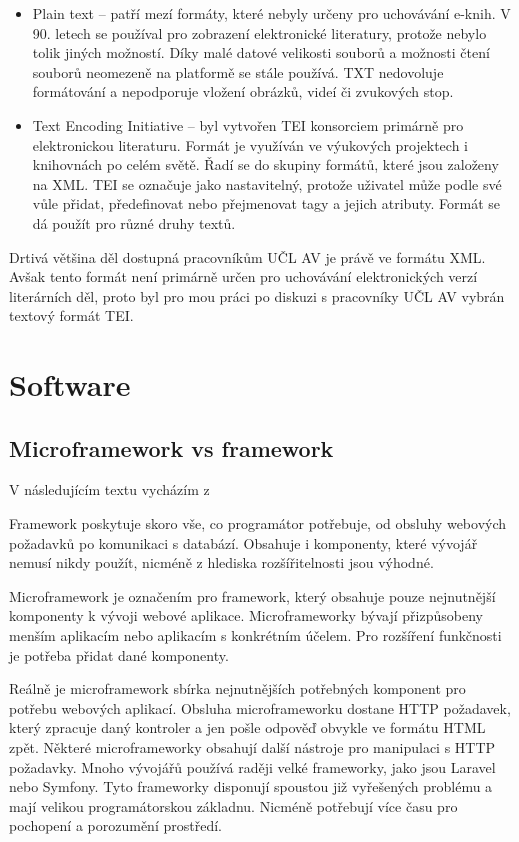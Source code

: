 \begin{itemize}
                \item Plain text – patří mezí formáty, které nebyly určeny pro uchovávání e-knih. V 90. letech se používal pro zobrazení elektronické literatury, protože nebylo tolik jiných možností. Díky malé datové velikosti souborů a možnosti čtení souborů neomezeně na platformě se stále používá. TXT nedovoluje formátování a nepodporuje vložení obrázků, videí či zvukových stop.
                
                \item Text Encoding Initiative – byl vytvořen TEI konsorciem primárně pro elektronickou literaturu. Formát je využíván ve výukových projektech i knihovnách po celém světě. Řadí se do skupiny formátů, které jsou založeny na XML. TEI se označuje jako nastavitelný, protože uživatel může podle své vůle přidat, předefinovat nebo přejmenovat tagy a jejich atributy. Formát se dá použít pro různé druhy textů.
            \end{itemize}
            
            Drtivá většina děl dostupná pracovníkům UČL AV je právě ve formátu XML. Avšak tento formát není primárně určen pro uchovávání elektronických verzí literárních děl, proto byl pro mou práci po diskuzi s pracovníky UČL AV vybrán textový formát TEI.
    \section{Software}
        \subsection{Microframework vs framework}
            V následujícím textu vycházím z \cite{microframework-vs-framework}
            
            Framework poskytuje skoro vše, co programátor potřebuje, od obsluhy webových požadavků po komunikaci s databází. Obsahuje i komponenty, které vývojář nemusí nikdy použít, nicméně z hlediska rozšířitelnosti jsou výhodné.
            
            Microframework je označením pro framework, který obsahuje pouze nejnutnější komponenty k vývoji webové aplikace. Microframeworky bývají přizpůsobeny menším aplikacím nebo aplikacím s konkrétním účelem. Pro rozšíření funkčnosti je potřeba přidat dané komponenty.
            
            Reálně je microframework sbírka nejnutnějších potřebných komponent pro potřebu webových aplikací. Obsluha microframeworku dostane HTTP požadavek, který zpracuje daný kontroler a jen pošle odpověď obvykle ve formátu HTML zpět. Některé microframeworky obsahují další nástroje pro manipulaci s HTTP požadavky. Mnoho vývojářů používá raději velké frameworky, jako jsou Laravel nebo Symfony. Tyto frameworky disponují spoustou již vyřešených problému a mají velikou programátorskou základnu. Nicméně potřebují více času pro pochopení a porozumění prostředí. 
            
